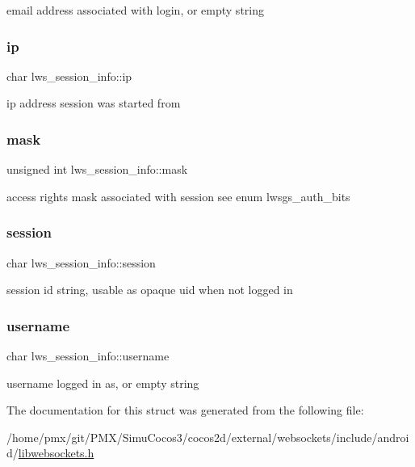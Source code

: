 email address associated with login, or empty string \mbox{\label{structlws__session__info_ae1025a6b22e5628f55c8c1b495b54bb8}} 
\subsubsection{\texorpdfstring{ip}{ip}}
{\footnotesize\ttfamily char lws\+\_\+session\+\_\+info\+::ip}

ip address session was started from \mbox{\label{structlws__session__info_afb924864b70f40372920688a5c1c895e}} 
\subsubsection{\texorpdfstring{mask}{mask}}
{\footnotesize\ttfamily unsigned int lws\+\_\+session\+\_\+info\+::mask}

access rights mask associated with session see enum lwsgs\+\_\+auth\+\_\+bits \mbox{\label{structlws__session__info_ac6b5a5a4d7d346603097f37144df03e3}} 
\subsubsection{\texorpdfstring{session}{session}}
{\footnotesize\ttfamily char lws\+\_\+session\+\_\+info\+::session}

session id string, usable as opaque uid when not logged in \mbox{\label{structlws__session__info_ac7f23c974e8ede87d477b1d0a88587f0}} 
\subsubsection{\texorpdfstring{username}{username}}
{\footnotesize\ttfamily char lws\+\_\+session\+\_\+info\+::username}

username logged in as, or empty string 

The documentation for this struct was generated from the following file\+:\begin{DoxyCompactItemize}
\item 
/home/pmx/git/\+P\+M\+X/\+Simu\+Cocos3/cocos2d/external/websockets/include/android/\hyperlink{_2cocos2d_2external_2websockets_2include_2android_2libwebsockets_8h}{libwebsockets.\+h}\end{DoxyCompactItemize}
